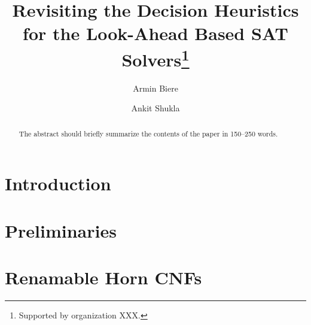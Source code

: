 \documentclass[runningheads]{llncs}
\begin{document}
%
\title{Revisiting the Decision Heuristics for the Look-Ahead Based SAT Solvers\thanks{Supported by organization  XXX.}}
%
%
\author{Armin Biere \and Ankit Shukla}

%
%
\maketitle              %
%
\begin{abstract}
The abstract should briefly summarize the contents of the paper in
150--250 words.

\end{abstract}
%
%
%
\section{Introduction} \label{sec:introduction}

\section{Preliminaries} \label{sec:preliminaries}

\section{Renamable Horn CNFs} \label{sec:renamable-horn}
%
%

 
 
\end{document}
